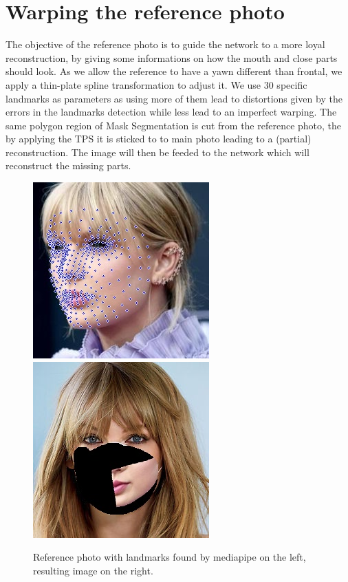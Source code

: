 \documentclass[10pt,twocolumn,letterpaper]{article}
\begin{document}
\section{Warping the reference photo}
The objective of the reference photo is to guide the network to a more loyal
reconstruction, by giving some informations on how the mouth and close parts should look.
As we allow the reference to have a yawn different than frontal,
we apply a thin-plate spline transformation to adjust it.
We use 30 specific landmarks as parameters as using
more of them lead to distortions given by the errors in the landmarks detection
while less lead to an imperfect warping. The same polygon region of Mask
Segmentation is cut from the reference photo, the by applying the TPS it is sticked
to to main photo leading to a (partial) reconstruction.
The image will then be feeded to the network which will reconstruct the missing parts.
\begin{figure}
  \caption{Reference photo with landmarks found by mediapipe on the left, resulting image on the right.}
  \includegraphics[width=0.49\linewidth]{img/landmarks_lateral.jpeg}
  \includegraphics[width=0.49\linewidth]{img/result.jpg}
\end{figure}
\end{document}

